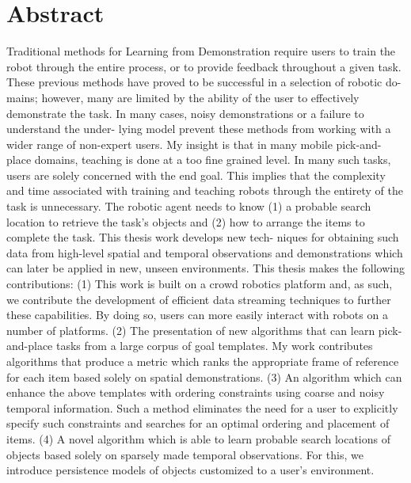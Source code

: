 \documentclass[12pt]{report}
\begin{document}

\chapter*{Abstract}
Traditional methods for Learning from Demonstration require users to train the
robot through the entire process, or to provide feedback throughout a given task.
These previous methods have proved to be successful in a selection of robotic do-
mains; however, many are limited by the ability of the user to effectively demonstrate
the task. In many cases, noisy demonstrations or a failure to understand the under-
lying model prevent these methods from working with a wider range of non-expert
users. My insight is that in many mobile pick-and-place domains, teaching is done
at a too fine grained level. In many such tasks, users are solely concerned with the
end goal. This implies that the complexity and time associated with training and
teaching robots through the entirety of the task is unnecessary. The robotic agent
needs to know (1) a probable search location to retrieve the task’s objects and (2)
how to arrange the items to complete the task. This thesis work develops new tech-
niques for obtaining such data from high-level spatial and temporal observations
and demonstrations which can later be applied in new, unseen environments.
This thesis makes the following contributions: (1) This work is built on a crowd
robotics platform and, as such, we contribute the development of efficient data
streaming techniques to further these capabilities. By doing so, users can more
easily interact with robots on a number of platforms. (2) The presentation of new
algorithms that can learn pick-and-place tasks from a large corpus of goal templates.
My work contributes algorithms that produce a metric which ranks the appropriate
frame of reference for each item based solely on spatial demonstrations. (3) An
algorithm which can enhance the above templates with ordering constraints using
coarse and noisy temporal information. Such a method eliminates the need for a
user to explicitly specify such constraints and searches for an optimal ordering and
placement of items. (4) A novel algorithm which is able to learn probable search
locations of objects based solely on sparsely made temporal observations. For this,
we introduce persistence models of objects customized to a user’s environment.

\pagebreak
\end{document}
